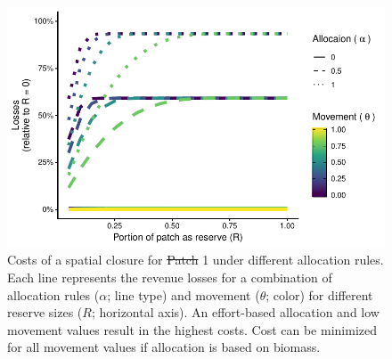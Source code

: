 \documentclass[12pt]{article}
\providecommand{\DIFaddtex}[1]{{\protect\color{blue}\uwave{#1}}} %
\providecommand{\DIFdeltex}[1]{{\protect\color{red}\sout{#1}}}                      %
\providecommand{\DIFaddFL}[1]{\DIFadd{#1}} %
\providecommand{\DIFdelFL}[1]{\DIFdel{#1}} %
\providecommand{\DIFaddbeginFL}{} %
\providecommand{\DIFaddendFL}{} %
\providecommand{\DIFdelbeginFL}{} %
\providecommand{\DIFdelendFL}{} %
\providecommand{\DIFadd}[1]{\texorpdfstring{\DIFaddtex{#1}}{#1}} %
\providecommand{\DIFdel}[1]{\texorpdfstring{\DIFdeltex{#1}}{}} %
\newcommand{\DIFscaledelfig}{0.5}
\newlength{\DIFdelgraphicswidth} %
\newlength{\DIFdelgraphicsheight} %
\newcommand{\DIFaddincludegraphics}[2][]{{\color{blue}\fbox{\DIFOincludegraphics[#1]{#2}}}} %
\newcommand{\DIFdelincludegraphics}[2][]{%
\sbox{\DIFdelgraphicsbox}{\DIFOincludegraphics[#1]{#2}}%
\settoboxwidth{\DIFdelgraphicswidth}{\DIFdelgraphicsbox} %
\settoboxtotalheight{\DIFdelgraphicsheight}{\DIFdelgraphicsbox} %
\scalebox{\DIFscaledelfig}{%
\parbox[b]{\DIFdelgraphicswidth}{\usebox{\DIFdelgraphicsbox}\\[-\baselineskip] \rule{\DIFdelgraphicswidth}{0em}}\llap{\resizebox{\DIFdelgraphicswidth}{\DIFdelgraphicsheight}{%
\setlength{\unitlength}{\DIFdelgraphicswidth}%
\begin{picture}(1,1)%
\thicklines\linethickness{2pt} %
{\color[rgb]{1,0,0}\put(0,0){\framebox(1,1){}}}%
{\color[rgb]{1,0,0}\put(0,0){\line( 1,1){1}}}%
{\color[rgb]{1,0,0}\put(0,1){\line(1,-1){1}}}%
\end{picture}%
}\hspace*{3pt}}} %
} %
\DeclareRobustCommand{\DIFaddbeginFL}{\DIFOaddbeginFL \let\includegraphics\DIFaddincludegraphics} %
\DeclareRobustCommand{\DIFaddendFL}{\DIFOaddendFL \let\includegraphics\DIFOincludegraphics} %
\DeclareRobustCommand{\DIFdelbeginFL}{\DIFOdelbeginFL \let\includegraphics\DIFdelincludegraphics} %
\DeclareRobustCommand{\DIFdelendFL}{\DIFOaddendFL \let\includegraphics\DIFOincludegraphics} %
\begin{document}
\begin{figure}[htbp]
\centering
\includegraphics{img/allocation_cost_plot.pdf}
\caption{\label{fig:allocation_cost_plot}Costs of a spatial closure for \DIFdelbeginFL \DIFdelFL{Patch }\DIFdelendFL \DIFaddbeginFL \DIFaddFL{Country }\DIFaddendFL 1 under different allocation rules. Each line represents the revenue losses for a combination of allocation rules ($\alpha$; line type) and movement ($\theta$; color) for different reserve sizes ($R$; horizontal axis). An effort-based allocation and low movement values result in the highest costs. Cost can be minimized for all movement values if allocation is based on biomass.}
\end{figure}
\end{document}
